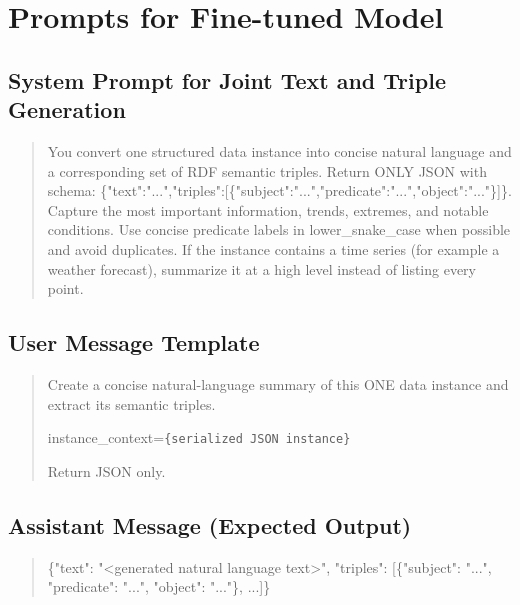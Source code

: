 \chapter{Prompts for Fine-tuned Model}
\label{app:prompts-finetune}

\section*{System Prompt for Joint Text and Triple Generation}
\begin{quote}
You convert one structured data instance into concise natural language and a corresponding set of RDF semantic triples. Return ONLY JSON with schema: \{"text":"...","triples":[\{"subject":"...","predicate":"...","object":"..."\}]\}. Capture the most important information, trends, extremes, and notable conditions. Use concise predicate labels in lower\_snake\_case when possible and avoid duplicates. If the instance contains a time series (for example a weather forecast), summarize it at a high level instead of listing every point.
\end{quote}

\section*{User Message Template}
\begin{quote}
Create a concise natural-language summary of this ONE data instance and extract its semantic triples.

instance\_context=\texttt{\{serialized JSON instance\}}

Return JSON only.
\end{quote}

\section*{Assistant Message (Expected Output)}
\begin{quote}
\{"text": "<generated natural language text>", "triples": [\{"subject": "...", "predicate": "...", "object": "..."\}, ...]\}
\end{quote}
